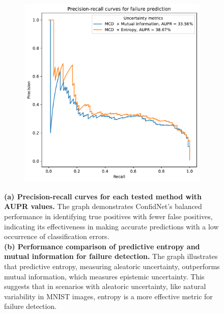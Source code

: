 \begin{figure}[H]
\begin{subfigure}{0.45\textwidth}
        \includegraphics[width=\textwidth]{failure_aupr_entropy_vs_mut_inf.pdf}
        \caption{}
        \label{fig:failure_aupr_entropy_vs_mut_inf}
    \end{subfigure}%
    \caption{\textbf{(a) Precision-recall curves for each tested method with AUPR values.} The graph demonstrates ConfidNet's balanced performance in identifying true positives with fewer false positives, indicating its effectiveness in making accurate predictions with a low occurrence of classification errors.\\\textbf{(b) Performance comparison of predictive entropy and mutual information for failure detection.} The graph illustrates that predictive entropy, measuring aleatoric uncertainty, outperforms mutual information, which measures epistemic uncertainty. This suggests that in scenarios with aleatoric uncertainty, like natural variability in MNIST images, entropy is a more effective metric for failure detection.}
\end{figure}

